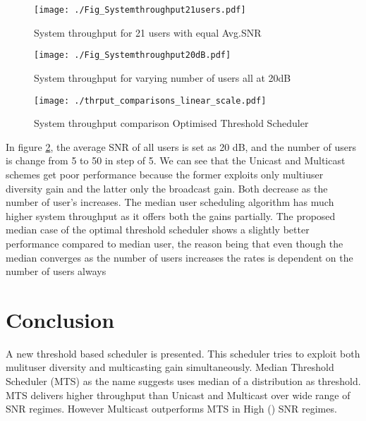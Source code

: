 \documentclass[conference]{IEEEtran}
\begin{document}
\begin{figure}[h]
\begin{center}
    \texttt{[image: ./Fig\_Systemthroughput21users.pdf]}
  \end{center}
  \vspace{-150pt}
  \caption{System throughput for 21 users with equal Avg.SNR }\label{Systemthroughput20users}
\end{figure}
\begin{figure}[h!]
\begin{center}
    \texttt{[image: ./Fig\_Systemthroughput20dB.pdf]}
  \end{center}
  \vspace{-10pt}
  \caption{System throughput for varying number of users all at 20dB}\label{Systemthroughput20dB}
\end{figure}

\begin{figure}[h!]
  \vspace{-10pt}
  \begin{center}
    \texttt{[image: ./thrput\_comparisons\_linear\_scale.pdf]}
  \end{center}
  \vspace{-10pt}
  \caption{System throughput comparison Optimised Threshold Scheduler}\label{Comparison of schedulers}
\end{figure}

In figure \ref{Systemthroughput20dB}, the average SNR of all users is set as 20 dB, and the number of users is change from 5 to 50 in step of 5. We can see that the Unicast and Multicast schemes get poor performance because the former exploits only multiuser diversity gain and the latter only the broadcast gain. Both decrease as the number of user’s increases. The median user scheduling algorithm has much higher system throughput as it offers both the gains partially. The proposed median case of the optimal threshold scheduler shows a slightly better performance compared to median user, the reason being that even though the median converges as the number of users increases the rates is dependent on the number of users always 




\section{Conclusion}
A new threshold based scheduler is presented. This scheduler tries to exploit both mulituser diversity and multicasting gain simultaneously. Median Threshold Scheduler (MTS) as the name suggests uses median of a distribution as threshold. MTS delivers higher throughput than Unicast and Multicast over wide range of SNR regimes. However Multicast outperforms MTS in High () SNR regimes.\\
\end{document}

